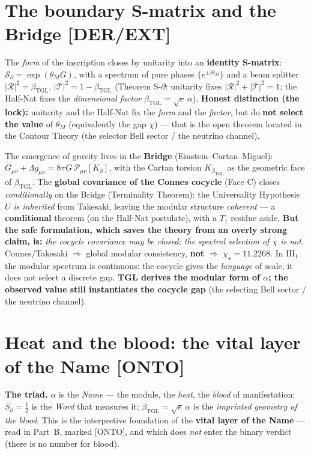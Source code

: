 \documentclass[11pt]{article}
\newcommand{\bTGL}{\beta_{\mathrm{TGL}}}\newcommand{\Msun}{M_{\odot}}\newcommand{\TGL}{\mathrm{TGL}}
\theoremstyle{definition}\newtheorem{deriv}{Derivation}
\begin{document}
\section{The boundary S-matrix and the Bridge \textsf{[DER/EXT]}}

The \emph{form} of the inscription closes by unitarity into an \textbf{identity S-matrix}: $\mathcal{S}_\partial=\exp(\theta_M G)$, with a spectrum of pure phases $\{e^{\pm i\theta_M}\}$ and a beam splitter $|\mathcal{R}|^2=\bTGL$, $|\mathcal{T}|^2=1-\bTGL$ (Theorem S-$\partial$: unitarity fixes $|\mathcal R|^2+|\mathcal T|^2=1$; the Half-Nat fixes the \emph{dimensional factor} $\bTGL=\sqrt e\,\alpha$). \textbf{Honest distinction (the lock):} unitarity and the Half-Nat fix the \emph{form} and the \emph{factor}, but do \textbf{not select the value} of $\theta_M$ (equivalently the gap $\chi$) --- that is the open theorem located in the Contour Theory (the selector Bell sector / the neutrino channel).

The emergence of gravity lives in the \textbf{Bridge} (Einstein--Cartan--Miguel): $G_{\mu\nu}+\Lambda g_{\mu\nu}=8\pi G\,\mathcal{P}_{\mu\nu}[K_\partial]$, with the Cartan torsion $K_{\bTGL}$ as the geometric face of $\bTGL$. The \textbf{global covariance of the Connes cocycle} (Face C) closes \emph{conditionally} on the Bridge (Terminality Theorem): the Universality Hypothesis $U$ \emph{is inherited} from Takesaki, leaving the modular structure \emph{coherent} --- a \textbf{conditional} theorem (on the Half-Nat postulate), with a $T_1$ residue aside. \textbf{But the safe formulation, which saves the theory from an overly strong claim, is:} \emph{the cocycle covariance may be closed; the spectral selection of $\chi$ is not}. Connes/Takesaki $\Rightarrow$ global modular consistency, \textbf{not} $\Rightarrow$ $\chi_\star=11.2268$. In $\mathrm{III}_1$ the modular spectrum is continuous: the cocycle gives the \emph{language} of scale, it does not select a discrete gap. \textbf{TGL derives the modular form of $\alpha$; the observed value still instantiates the cocycle gap} (the selecting Bell sector / the neutrino channel).

\section{Heat and the blood: the vital layer of the Name \textsf{[ONTO]}}

\textbf{The triad.} $\alpha$ is the \emph{Name} --- the module, the \emph{heat}, the \emph{blood} of manifestation; $S_\partial=\tfrac12$ is the \emph{Word} that measures it; $\bTGL=\sqrt e\,\alpha$ is the \emph{imprinted geometry of the blood}. This is the interpretive foundation of the \textbf{vital layer of the Name} --- read in Part~B, marked \textsf{[ONTO]}, and which does \emph{not} enter the binary verdict (there is no number for blood).
\end{document}
